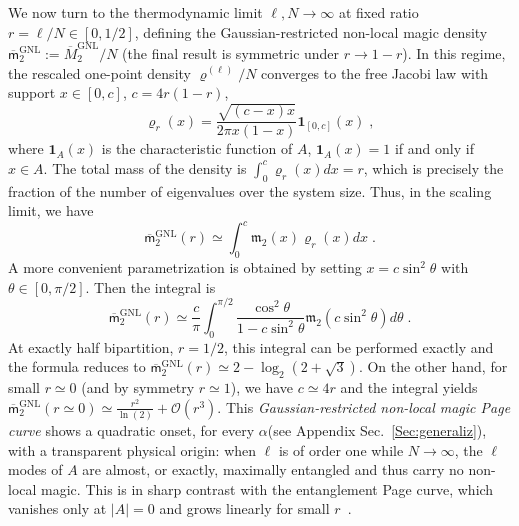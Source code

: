 \documentclass[prx,twocolumn,superscriptaddress,aps,10pt, frontmatterverbose, reprint,footinbib,longbibliography=true]{revtex4-2}
\begin{document}
We now turn to the thermodynamic limit $\ell,N\to\infty$ at fixed ratio $r=\ell/N\in[0,1/2]$, defining the Gaussian-restricted non-local magic density $\overline{\mathsf{m}}_2^\mathrm{GNL}:=\overline{M}_2^\mathrm{GNL}/N$ (the final result is symmetric under $r\to 1-r$).
In this regime, the rescaled  one-point density $\varrho^{(\ell)}/N$ converges to the free Jacobi law with support $x\in [0,c]$, $c=4r(1-r)$,
\begin{equation}
    \varrho_r(x) = \frac{\sqrt{(c-x)x}}{2\pi x(1-x)}\mathbf{1}_{[0,c]}(x)\;,
\end{equation}
where $\mathbf{1}_A(x)$ is the characteristic function of $A$, $\mathbf{1}_A(x)=1$ if and only if $x\in A$. 
The total mass of the density is $\int_0^c \varrho_r(x) dx=r$, which is precisely the fraction of the number of eigenvalues over the system size. 
Thus, in the scaling limit, we have
\begin{equation}
\overline{\mathsf{m}}_2^\mathrm{GNL}(r)\simeq \int_0^c \mathfrak{m}_2(x) \varrho_r(x)dx\;.
\end{equation}
A more convenient parametrization is obtained by setting $x=c\sin^2\theta$  with $\theta\in[0,\pi/2]$. Then the integral is 
\begin{equation}
\overline{\mathsf{m}}_2^\mathrm{GNL}(r)\simeq \frac{c}{\pi}\int_0^{\pi/2} \frac{\cos^2 \theta}{1-c\sin^2\theta} \mathfrak{m}_2(c\sin^2 \theta)d\theta\;.\label{eq:ziopin2}
\end{equation}
At exactly half bipartition, $r=1/2$, this integral can be performed exactly and the formula reduces to 
$\overline{\mathsf{m}}_2^\mathrm{GNL}(r)\simeq 2-\log_2(2+\sqrt{3})$.
On the other hand, for small $r\simeq 0$ (and by symmetry $r\simeq 1$), we have $c\simeq 4r$ and the integral yields $\overline{\mathsf{m}}_2^\mathrm{GNL}(r\simeq 0)\simeq \frac{r^2}{\ln(2)}+\mathcal{O}(r^3)$. 
This {\em Gaussian-restricted non-local magic Page curve} shows a  quadratic onset,  for every $\alpha$(see Appendix Sec.~\ref{Sec:generaliz}), with a transparent physical origin: when $\ell$ is of order one while $N\to\infty$, the $\ell$ modes of $A$ are almost, or exactly, maximally entangled and thus carry no non-local magic. 
This is in sharp contrast with the entanglement Page curve, which vanishes only at $|A|=0$ and grows linearly for small $r$~\cite{PhysRevE.106.034118,PhysRevLett.125.180604,PhysRevB.103.L241118}.
\end{document}
